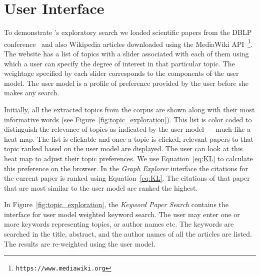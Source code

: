 
\section{User Interface}
\label{sec:demo}


To demonstrate \system's exploratory search we loaded scientific 
papers from the DBLP conference~\cite{Tang:2008:EMA:1367497.1367722} 
and also Wikipedia articles downloaded using the MediaWiki API~\footnote{\texttt{https://www.mediawiki.org}}.
The {\system} website has a list of topics with a slider associated 
with each of them using which a user can specify the degree of 
interest in that particular topic. The weightage specified by each 
slider corresponds to the components of the user model. The user 
model is a profile of preference provided by the user before she 
makes any search.

Initially, all the extracted topics from the corpus are shown along 
with their most informative words (see Figure~\ref{fig:topic_exploration}).
This list is color coded to distinguish the relevance of topics as indicated by the user model --- much like a heat map.
The list is clickable and once a topic is clicked, relevant papers to that topic ranked based on the user model are displayed.
The user can look at this heat map to adjust their topic preferences.
We use Equation~\ref{eq:KL} to calculate this preference on the \system browser. 
In the \textsl{Graph Explorer} interface the citations for the current paper is ranked
using Equation~\ref{eq:KL}. The citations of that paper that are most
similar to the user model are ranked the highest.


In Figure~\ref{fig:topic_exploration}, the \textsl{Keyword Paper 
Search} contains the interface for user model weighted keyword search.
The user may enter one or more keywords representing topics, or 
author names etc. The keywords are searched in the title, abstract, 
and the author names of all the articles are listed. The results are  
re-weighted using the user model. 

